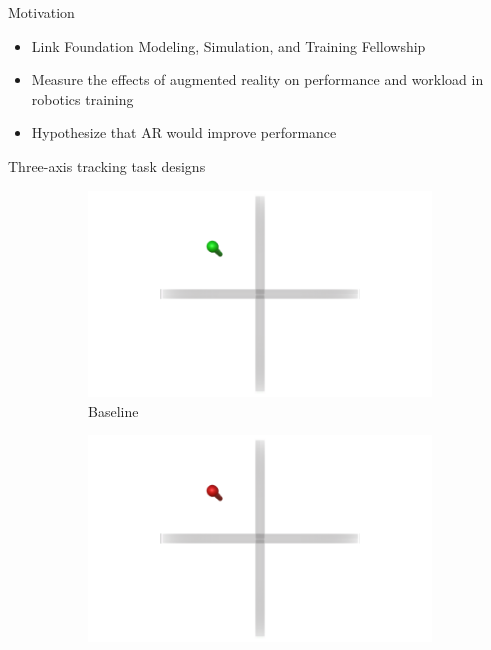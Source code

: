 \documentclass[10pt]{beamer}
\begin{document}
\begin{frame}[fragile]{Motivation}
  \begin{itemize}
    \setlength\itemsep{1em}
    \item Link Foundation Modeling, Simulation, and Training Fellowship
    \item Measure the effects of augmented reality on performance and workload in robotics training
    \item Hypothesize that AR would improve performance
  \end{itemize}
\end{frame}

\begin{frame}[fragile]{Three-axis tracking task designs}
  \begin{figure}
    \begin{center}
      \begin{subfigure}{0.45\linewidth}
        \includegraphics[width=\linewidth]{../img/Baseline.png}
        \caption{Baseline}
      \end{subfigure}\hfill
      \begin{subfigure}{0.45\linewidth}
        \includegraphics[width=\linewidth]{../img/Color.png}

\end{subfigure}
\end{center}
\end{figure}
\end{frame}
\end{document}
